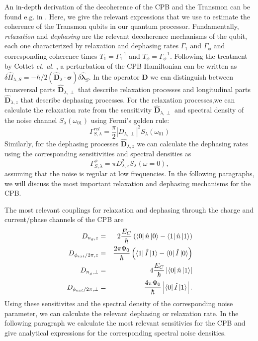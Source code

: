 An in-depth derivation of the decoherence of the CPB and the Transmon can be found e.g. in \citep{cottet_implementation_2002,koch_charge-insensitive_2007}. Here, we give the relevant expressions that we use to estimate the coherence of the Transmon qubits in our quantum processor. Fundamentally, {\it relaxation} and {\it dephasing} are the relevant decoherence mechanisms of the qubit, each one characterized by relaxation and dephasing rates $\Gamma_1$ and $\Gamma_\phi$ and corresponding coherence times $T_1=\Gamma_1^{-1}$ and $T_\phi=\Gamma_\phi^{-1}$. Following the treatment by Cottet {\it et. al.} \citep{cottet_implementation_2002}, a perturbation of the CPB Hamiltonian can be written as $\delta \hat{H}_{\lambda,S}=-\hbar/2(\mathbf{\hat{D}}_\lambda\cdot\mathbf{\sigma})\delta \mathbf{\hat{\lambda}}_S$. In the operator $\mathbf{D}$ we can distinguish between transversal parts $\hat{\mathbf{D}}_{\lambda,\perp}$ that describe relaxation processes and longitudinal parts $\hat{\mathbf{D}}_{\lambda,z}$ that describe dephasing processes. For the relaxation processes,we can calculate the relaxation rate from the sensitivity $\hat{\mathbf{D}}_{\lambda,\perp}$ and spectral density of the noise channel $S_{\lambda}(\omega_{01})$ using Fermi's golden rule:
%
\begin{equation}
\Gamma^{rel}_{S,\lambda} = \frac{\pi}{2}|D_{\lambda,\perp}|^2 S_{\lambda}(\omega_{01})
\end{equation}
%
Similarly, for the dephasing processes $\hat{\mathbf{D}}_{\lambda,z}$ we can calculate the dephasing rates using the corresponding sensitivities and spectral densities as
%
\begin{equation}
\Gamma_{S,\lambda}^\phi = \pi D_{\lambda,z}^2 S_{\lambda}(\omega = 0),
\end{equation}
%
assuming that the noise is regular at low frequencies. In the following paragraphs, we will discuss the most important relaxation and dephasing mechanisms for the CPB.

\smallskip

The most relevant couplings for relaxation and dephasing through the charge and current/phase channels of the CPB are
%
\begin{eqnarray}
D_{n_g,z} & = & 2\frac{E_C}{\hbar}\left(\left< 0 \right|\hat{n}\left| 0 \right>-\left< 1 \right|\hat{n}\left| 1 \right>\right) \\
D_{\phi_{ext}/2\pi,z} & = & \frac{2\pi\Phi_0}{\hbar}\left(\left< 1 \right|\hat{I}\left| 1 \right>-\left< 0 \right|\hat{I}\left| 0 \right>\right) \\
D_{n_g,\perp} & = & 4\frac{E_C}{\hbar}\left|\left< 0 \right|\hat{n}\left| 1 \right>\right| \\
D_{\phi_{ext}/2\pi,\perp} & = & \frac{4\pi\Phi_0}{\hbar}\left|\left< 0 \right|\hat{I}\left| 1 \right>\right|.
\end{eqnarray}
%
Using these sensitivites and the spectral density of the corresponding noise parameter, we can calculate the relevant dephasing or relaxation rate. In the following paragraph we calculate the most relevant sensitivies for the CPB and give analytical expressions for the corresponding spectral noise densities.

